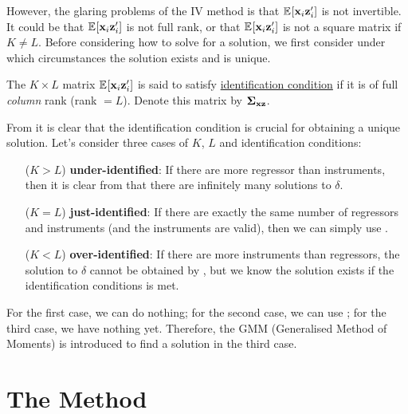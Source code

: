 \documentclass{article}
\begin{document}
However, the glaring problems of the IV method is that $\operatorname{\mathbb{E}}_{}\!\left[\mathbf{x}_i\mathbf{z}_i'\right]$ is not invertible.
It could be that $\operatorname{\mathbb{E}}_{}\!\left[\mathbf{x}_i\mathbf{z}_i'\right]$ is not full rank,
or that $\operatorname{\mathbb{E}}_{}\!\left[\mathbf{x}_i\mathbf{z}_i'\right]$ is not a square matrix if $K\neq L$.
Before considering how to solve for a solution,
we first consider under which circumstances the solution exists and is unique.

\begin{definition}[Identification]
	The $K\times L$ matrix $\operatorname{\mathbb{E}}_{}\!\left[\mathbf{x}_i\mathbf{z}_i'\right]$
	is said to satisfy \underline{identification condition} if
	it is of full \emph{column} rank (rank $=L$).
	Denote this matrix by $\boldsymbol{\Sigma}_{\mathbf{x}\mathbf{z}}$.
\end{definition}

From  it is clear that the identification condition is crucial
for obtaining a unique solution.
Let's consider three cases of $K$, $L$ and identification conditions:
\begin{enumerate}[label = \arabic*.]
	\item[($K>L$)]\textbf{under-identified}:
		If there are more regressor than instruments,
		then it is clear from  that there are infinitely many
		solutions to $\delta$.
	\item[($K=L$)]\textbf{just-identified}:
		If there are exactly the same number of regressors and instruments
		(and the instruments are valid),
		then we can simply use .
	\item[($K<L$)]\textbf{over-identified}:
		If there are more instruments than regressors,
		the solution to $\delta$ cannot be obtained by ,
		but we know the solution exists
		if the identification conditions is met.
\end{enumerate}
For the first case, we can do nothing;
for the second case, we can use ;
for the third case, we have nothing yet.
Therefore, the GMM (Generalised Method of Moments) is introduced to find a solution in the third case.

\section{The Method}
\end{document}
